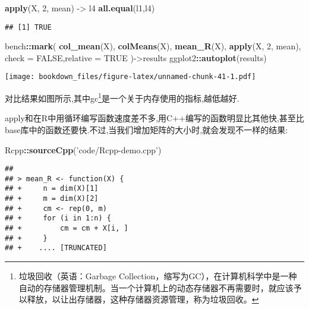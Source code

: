 \documentclass[]{ctexbook}
\newenvironment{Shaded}{\begin{snugshade}}{\end{snugshade}}
\newcommand{\DataTypeTok}[1]{\textcolor[rgb]{0.13,0.29,0.53}{#1}}
\newcommand{\DecValTok}[1]{\textcolor[rgb]{0.00,0.00,0.81}{#1}}
\newcommand{\KeywordTok}[1]{\textcolor[rgb]{0.13,0.29,0.53}{\textbf{#1}}}
\newcommand{\NormalTok}[1]{#1}
\newcommand{\OperatorTok}[1]{\textcolor[rgb]{0.81,0.36,0.00}{\textbf{#1}}}
\newcommand{\OtherTok}[1]{\textcolor[rgb]{0.56,0.35,0.01}{#1}}
\newcommand{\StringTok}[1]{\textcolor[rgb]{0.31,0.60,0.02}{#1}}
\begin{document}
\begin{Shaded}
\begin{Highlighting}[]
\KeywordTok{apply}\NormalTok{(X, }\DecValTok{2}\NormalTok{, mean) ->}\StringTok{ }\NormalTok{l4}
\KeywordTok{all.equal}\NormalTok{(l1,l4)}
\end{Highlighting}
\end{Shaded}

\begin{verbatim}
## [1] TRUE
\end{verbatim}

\begin{Shaded}
\begin{Highlighting}[]
\NormalTok{bench}\OperatorTok{::}\KeywordTok{mark}\NormalTok{(}
  \KeywordTok{col_mean}\NormalTok{(X),}
  \KeywordTok{colMeans}\NormalTok{(X),}
  \KeywordTok{mean_R}\NormalTok{(X),}
  \KeywordTok{apply}\NormalTok{(X, }\DecValTok{2}\NormalTok{, mean),}
  \DataTypeTok{check =} \OtherTok{FALSE}\NormalTok{,}\DataTypeTok{relative =} \OtherTok{TRUE}
\NormalTok{)->results}
\NormalTok{ggplot2}\OperatorTok{::}\KeywordTok{autoplot}\NormalTok{(results)}
\end{Highlighting}
\end{Shaded}

\texttt{[image: bookdown\_files/figure-latex/unnamed-chunk-41-1.pdf]}

对比结果如图所示,其中gc\footnote{垃圾回收（英语：Garbage Collection，缩写为GC），在计算机科学中是一种自动的存储器管理机制。当一个计算机上的动态存储器不再需要时，就应该予以释放，以让出存储器，这种存储器资源管理，称为垃圾回收。}是一个关于内存使用的指标,越低越好.

apply和在R中用循环编写函数速度差不多,用C++编写的函数明显比其他快,甚至比base库中的函数还要快.不过,当我们增加矩阵的大小时,就会发现不一样的结果:

\begin{Shaded}
\begin{Highlighting}[]
\NormalTok{Rcpp}\OperatorTok{::}\KeywordTok{sourceCpp}\NormalTok{(}\StringTok{'code/Rcpp-demo.cpp'}\NormalTok{)}
\end{Highlighting}
\end{Shaded}

\begin{verbatim}
## 
## > mean_R <- function(X) {
## +     n = dim(X)[1]
## +     m = dim(X)[2]
## +     cm <- rep(0, m)
## +     for (i in 1:n) {
## +         cm = cm + X[i, ]
## +     }
## +    .... [TRUNCATED]
\end{verbatim}
\end{document}

